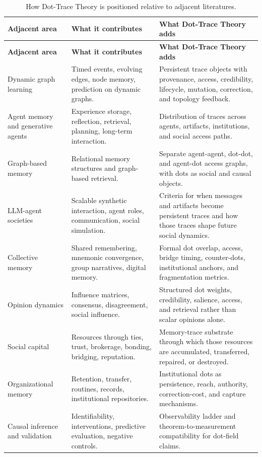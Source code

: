 \documentclass[11pt]{article}
\theoremstyle{remark}
\begin{document}
{\small
\begin{longtable}{L{0.20\textwidth}L{0.28\textwidth}L{0.34\textwidth}}
\caption{How Dot-Trace Theory is positioned relative to adjacent literatures.}\label{tab:literature-positioning}\\
\toprule
\textbf{Adjacent area} & \textbf{What it contributes} & \textbf{What Dot-Trace Theory adds}\\
\midrule
\endfirsthead
\toprule
\textbf{Adjacent area} & \textbf{What it contributes} & \textbf{What Dot-Trace Theory adds}\\
\midrule
\endhead
Dynamic graph learning & Timed events, evolving edges, node memory, prediction on dynamic graphs. & Persistent trace objects with provenance, access, credibility, lifecycle, mutation, correction, and topology feedback.\\
Agent memory and generative agents & Experience storage, reflection, retrieval, planning, long-term interaction. & Distribution of traces across agents, artifacts, institutions, and social access paths.\\
Graph-based memory & Relational memory structures and graph-based retrieval. & Separate agent-agent, dot-dot, and agent-dot access graphs, with dots as social and causal objects.\\
LLM-agent societies & Scalable synthetic interaction, agent roles, communication, social simulation. & Criteria for when messages and artifacts become persistent traces and how those traces shape future social dynamics.\\
Collective memory & Shared remembering, mnemonic convergence, group narratives, digital memory. & Formal dot overlap, access, bridge timing, counter-dots, institutional anchors, and fragmentation metrics.\\
Opinion dynamics & Influence matrices, consensus, disagreement, social influence. & Structured dot weights, credibility, salience, access, and retrieval rather than scalar opinions alone.\\
Social capital & Resources through ties, trust, brokerage, bonding, bridging, reputation. & Memory-trace substrate through which those resources are accumulated, transferred, repaired, or destroyed.\\
Organizational memory & Retention, transfer, routines, records, institutional repositories. & Institutional dots as persistence, reach, authority, correction-cost, and capture mechanisms.\\
Causal inference and validation & Identifiability, interventions, predictive evaluation, negative controls. & Observability ladder and theorem-to-measurement compatibility for dot-field claims.\\
\bottomrule
\end{longtable}
}
\end{document}

